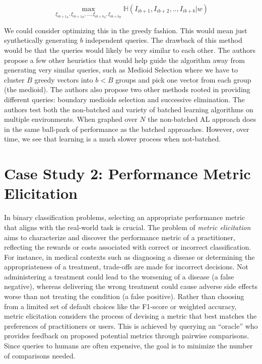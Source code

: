 \documentclass[
  letterpaper,
  numbers=noenddot,
  DIV=11]{scrreprt}
\theoremstyle{plain}
\theoremstyle{definition}
\theoremstyle{remark}
\begin{document}
\[\max_{\xi_{ib+1_A}, \xi_{ib+1_B}, ... , \xi_{ib+b_A}, \xi_{ib+b_B}} \mathbb{H}(I_{ib+1}, I_{ib+2}, .., I_{ib+b} | w)\]

We could consider optimizing this in the greedy fashion. This would mean
just synthetically generating \(b\) independent queries. The drawback of
this method would be that the queries would likely be very similar to
each other. The authors propose a few other heuristics that would help
guide the algorithm away from generating very similar queries, such as
Medioid Selection where we have to cluster \(B\) greedy vectors into
\(b < B\) groups and pick one vector from each group (the medioid). The
authors also propose two other methods rooted in providing different
queries: boundary medioids selection and successive elimination. The
authors test both the non-batched and variety of batched learning
algorithms on multiple environments. When graphed over \(N\) the
non-batched AL approach does in the same ball-park of performance as the
batched approaches. However, over time, we see that learning is a much
slower process when not-batched.

\section{Case Study 2: Performance Metric
Elicitation}\label{sec-metric-elicitation}

In binary classification problems, selecting an appropriate performance
metric that aligns with the real-world task is crucial. The problem of
\emph{metric elicitation} aims to characterize and discover the
performance metric of a practitioner, reflecting the rewards or costs
associated with correct or incorrect classification. For instance, in
medical contexts such as diagnosing a disease or determining the
appropriateness of a treatment, trade-offs are made for incorrect
decisions. Not administering a treatment could lead to the worsening of
a disease (a false negative), whereas delivering the wrong treatment
could cause adverse side effects worse than not treating the condition
(a false positive). Rather than choosing from a limited set of default
choices like the F1-score or weighted accuracy, metric elicitation
considers the process of devising a metric that best matches the
preferences of practitioners or users. This is achieved by querying an
``oracle'' who provides feedback on proposed potential metrics through
pairwise comparisons. Since queries to humans are often expensive, the
goal is to minimize the number of comparisons needed.
\end{document}
